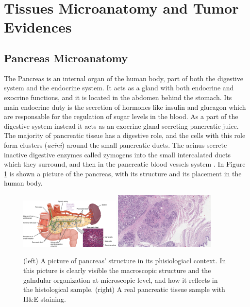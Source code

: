 \section{Tissues Microanatomy and Tumor Evidences} \label{ssec:micr_anat}


\subsection{Pancreas Microanatomy} \label{ssec:pancr_anat}
    The Pancreas is an internal organ of the human body, part of both the digestive system and the endocrine system. It acts as a gland with both endocrine and exocrine functions, and it is located in the abdomen behind the stomach. Its main endocrine duty is the secretion of hormones like insulin and glucagon which are responsable for the regulation of sugar levels in the blood. As a part of the digestive system instead it acts as an exocrine gland secreting pancreatic juice. The majority of pancreatic tissue has a digestive role, and the cells with this role form clusters (\textit{acini}) around the small pancreatic ducts. The acinus secrete inactive digestive enzymes called zymogens into the small intercalated ducts which they surround, and then in the pancreatic blood vessels system \cite{Pancreas}. In Figure \ref{fig:panc_struct} is shown a picture of the pancreas, with its structure and its placement in the human body.

     \begin{figure}
         \centering
         \includegraphics[width = 0.45\textwidth]{images/panc_struct}
         \includegraphics[width = 0.45\textwidth]{images/panc_specimen}
         \caption{(left) A picture of pancreas' structure in its phisiologiacl context. In this picture is clearly visible the macroscopic structure and the galndular organization at microscopic level, and how it reflects in the histological sample. (right) A real pancreatic tissue sample with H\&E staining.}
         \label{fig:panc_struct}
     \end{figure}

